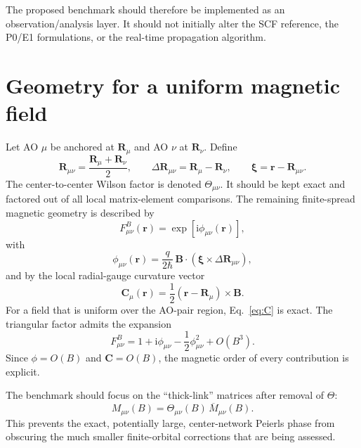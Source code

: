 \documentclass[11pt]{article}
\newcommand{\ii}{\mathrm{i}}
\newcommand{\vect}[1]{\bm{#1}}
\begin{document}
The proposed benchmark should therefore be implemented as an observation/analysis layer.  It should not initially alter the SCF reference, the P0/E1 formulations, or the real-time propagation algorithm.

\section{Geometry for a uniform magnetic field}

Let AO $\mu$ be anchored at $\vect R_\mu$ and AO $\nu$ at $\vect R_\nu$.  Define
\begin{equation}
\vect R_{\mu\nu}=\frac{\vect R_\mu+\vect R_\nu}{2},
\qquad
\Delta\vect R_{\mu\nu}=\vect R_\mu-\vect R_\nu,
\qquad
\vect\xi=\vect r-\vect R_{\mu\nu}.
\end{equation}
The center-to-center Wilson factor is denoted $\Theta_{\mu\nu}$.  It should be kept exact and factored out of all local matrix-element comparisons.  The remaining finite-spread magnetic geometry is described by
\begin{equation}
F^B_{\mu\nu}(\vect r)=\exp\!\left[\ii\phi_{\mu\nu}(\vect r)\right],
\end{equation}
with
\begin{equation}
\phi_{\mu\nu}(\vect r)
=\frac{q}{2\hbar}\,
\vect B\cdot\left(\vect\xi\times\Delta\vect R_{\mu\nu}\right),
\label{eq:phi}
\end{equation}
and by the local radial-gauge curvature vector
\begin{equation}
\vect C_\mu(\vect r)
=\frac12(\vect r-\vect R_\mu)\times\vect B.
\label{eq:C}
\end{equation}
For a field that is uniform over the AO-pair region, Eq.~\eqref{eq:C} is exact.  The triangular factor admits the expansion
\begin{equation}
F^B_{\mu\nu}
=1+\ii\phi_{\mu\nu}
-\frac12\phi_{\mu\nu}^2
+O(B^3).
\label{eq:Fexp}
\end{equation}
Since $\phi=O(B)$ and $\vect C=O(B)$, the magnetic order of every contribution is explicit.

The benchmark should focus on the ``thick-link'' matrices after removal of $\Theta$:
\begin{equation}
M_{\mu\nu}(B)=\Theta_{\mu\nu}(B)\,\overline M_{\mu\nu}(B).
\end{equation}
This prevents the exact, potentially large, center-network Peierls phase from obscuring the much smaller finite-orbital corrections that are being assessed.
\end{document}
